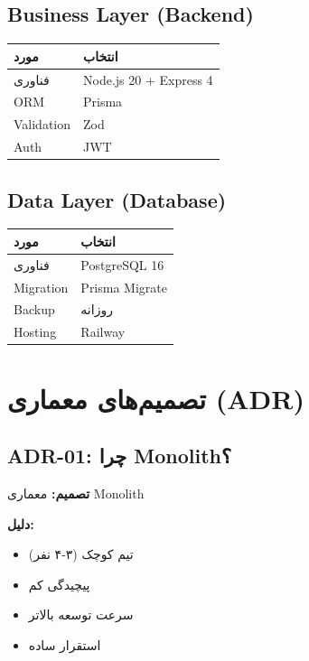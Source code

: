 \documentclass[12pt, a4paper]{article}
\begin{document}
\subsection{Business Layer (Backend)}

\begin{center}
\begin{tabular}{|l|l|}
\hline
\textbf{مورد} & \textbf{انتخاب} \\
\hline
فناوری & Node.js 20 + Express 4 \\
\hline
ORM & Prisma \\
\hline
Validation & Zod \\
\hline
Auth & JWT \\
\hline
\end{tabular}
\end{center}

\subsection{Data Layer (Database)}

\begin{center}
\begin{tabular}{|l|l|}
\hline
\textbf{مورد} & \textbf{انتخاب} \\
\hline
فناوری & PostgreSQL 16 \\
\hline
Migration & Prisma Migrate \\
\hline
Backup & روزانه \\
\hline
Hosting & Railway \\
\hline
\end{tabular}
\end{center}

\section{تصمیم‌های معماری (ADR)}

\subsection{ADR-01: چرا Monolith؟}

\textbf{تصمیم:} معماری Monolith

\textbf{دلیل:}
\begin{itemize}
    \item تیم کوچک (۳-۴ نفر)
    \item پیچیدگی کم
    \item سرعت توسعه بالاتر
    \item استقرار ساده
\end{itemize}
\end{document}

